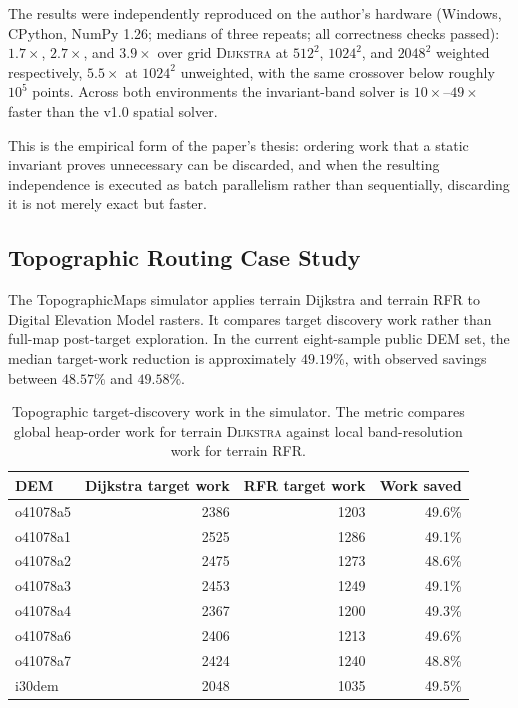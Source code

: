 \documentclass[11pt]{article}
\newcommand{\RFR}{\textsc{RFR}}
\newcommand{\Dijkstra}{\textsc{Dijkstra}}
\begin{document}
The results were independently reproduced on the author's hardware (Windows, CPython, NumPy 1.26; medians of three repeats; all correctness checks passed): $1.7\times$, $2.7\times$, and $3.9\times$ over grid \Dijkstra{} at $512^2$, $1024^2$, and $2048^2$ weighted respectively, $5.5\times$ at $1024^2$ unweighted, with the same crossover below roughly $10^5$ points. Across both environments the invariant-band solver is $10\times$--$49\times$ faster than the v1.0 spatial solver.

This is the empirical form of the paper's thesis: ordering work that a static invariant proves unnecessary can be discarded, and when the resulting independence is executed as batch parallelism rather than sequentially, discarding it is not merely exact but faster.

\subsection{Topographic Routing Case Study}

The TopographicMaps simulator applies terrain Dijkstra and terrain \RFR{} to Digital Elevation Model rasters. It compares target discovery work rather than full-map post-target exploration. In the current eight-sample public DEM set, the median target-work reduction is approximately $49.19\%$, with observed savings between $48.57\%$ and $49.58\%$.

\begin{table}[htbp]
\centering
\begin{tabular}{lrrr}
\toprule
DEM & Dijkstra target work & RFR target work & Work saved \\
\midrule
o41078a5 & 2386 & 1203 & 49.6\% \\
o41078a1 & 2525 & 1286 & 49.1\% \\
o41078a2 & 2475 & 1273 & 48.6\% \\
o41078a3 & 2453 & 1249 & 49.1\% \\
o41078a4 & 2367 & 1200 & 49.3\% \\
o41078a6 & 2406 & 1213 & 49.6\% \\
o41078a7 & 2424 & 1240 & 48.8\% \\
i30dem & 2048 & 1035 & 49.5\% \\
\bottomrule
\end{tabular}
\caption{Topographic target-discovery work in the simulator. The metric compares global heap-order work for terrain \Dijkstra{} against local band-resolution work for terrain \RFR{}.}
\label{tab:topographic}
\end{table}
\end{document}
